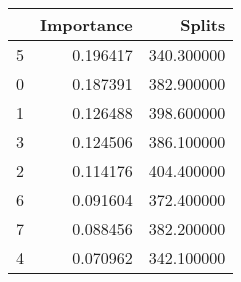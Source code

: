 \begin{tabular}{lrr}
\toprule
 & Importance & Splits \\
\midrule
5 & 0.196417 & 340.300000 \\
0 & 0.187391 & 382.900000 \\
1 & 0.126488 & 398.600000 \\
3 & 0.124506 & 386.100000 \\
2 & 0.114176 & 404.400000 \\
6 & 0.091604 & 372.400000 \\
7 & 0.088456 & 382.200000 \\
4 & 0.070962 & 342.100000 \\
\bottomrule
\end{tabular}